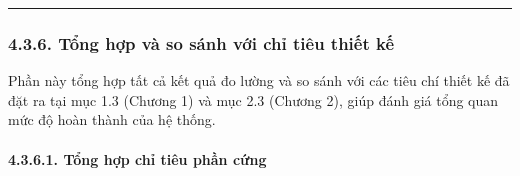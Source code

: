\documentclass[a4paper]{extarticle}
\begin{document}
\begin{center}\rule{0.5\linewidth}{0.5pt}\end{center}

\subsubsection{4.3.6. Tổng hợp và so sánh với chỉ tiêu thiết
kế}\label{436-tux1ed5ng-hux1ee3p-vuxe0-so-suxe1nh-vux1edbi-chux1ec9-tiuxeau-thiux1ebft-kux1ebf}

Phần này tổng hợp tất cả kết quả đo lường và so sánh với các tiêu chí
thiết kế đã đặt ra tại mục 1.3 (Chương 1) và mục 2.3 (Chương 2), giúp
đánh giá tổng quan mức độ hoàn thành của hệ thống.

\paragraph{4.3.6.1. Tổng hợp chỉ tiêu phần
cứng}\label{4361-tux1ed5ng-hux1ee3p-chux1ec9-tiuxeau-phux1ea7n-cux1ee9ng}
\end{document}
